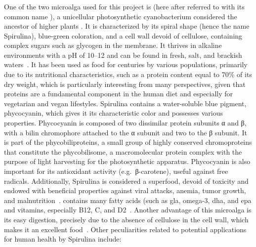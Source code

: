 \subsubsection{}
One of the two microalga used for this project is  (here after referred to with its common name ), a unicellular photosynthetic cyanobacterium considered the ancestor of higher plants . It is characterized by its spiral shape (hence the name Spirulina), blue-green coloration, and a cell wall devoid of cellulose, containing complex sugars such as glycogen in the membrane. It thrives in alkaline environments with a pH of \numrange[range-phrase={--}]{10}{12} and can be found in fresh, salt, and brackish waters~\parencite{mohan_spirulina_2014}. It has been used as food for centuries by various populations, primarily due to its nutritional characteristics, such as a protein content equal to \num{70}\% of its dry weight, which is particularly interesting from many perspectives, given that proteins are a fundamental component in the human diet and especially for vegetarian and vegan lifestyles. Spirulina contains a water-soluble blue pigment, phycocyanin, which gives it its characteristic color and possesses various properties. Phycocyanin is composed of two dissimilar protein subunits α and β, with a bilin chromophore attached to the α subunit and two to the β subunit. It is part of the phycobiliproteins, a small group of highly conserved chromoproteins that constitute the phycobilisome, a macromolecular protein complex with the purpose of light harvesting for the photosynthetic apparatus. Phycocyanin is also important for its antioxidant activity (e.g.~β-carotene), useful against free radicals. Additionally, Spirulina is considered a superfood, devoid of toxicity and endowed with beneficial properties against viral attacks, anemia, tumor growth, and malnutrition~\parencite{saranraj_spirulina_2014}.  contains many fatty acids (such as \gls{gla}, omega-3, \gls{dha}, and \gls{epa} and vitamins, especially B12, C, and D2~\parencite{moons_drivers_2017}. Another advantage of this microalga is its easy digestion, precisely due to the absence of cellulose in the cell wall, which makes it an excellent food~\parencite{mohammadi_Spirulina_2022}. Other peculiarities related to potential applications for human health by Spirulina include:

